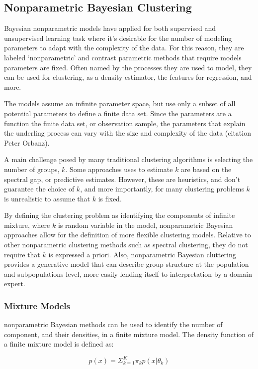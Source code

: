 \subsection{Nonparametric Bayesian Clustering}
Bayesian nonparametric models have applied for both supervised and unsupervised learning task where it's desirable for the number of modeling parameters to adapt with the complexity of the data.   For this reason, they are labeled `nonparametric' and contrast parametric methods that require models parameters are fixed.  Often named by the processes they are used to model, they can be used for clustering, as a density estimator, the features for regression, and more.

The models assume an infinite parameter space, but use only a subset of all potential parameters to define a finite data set.   Since the parameters are a function the finite data set, or observation sample, the parameters that explain the underling process can vary with the size and complexity of the data (citation Peter Orbanz).

A main challenge posed by many traditional clustering algorithms is selecting the number of groups, $k$.   Some approaches uses to estimate $k$ are based on the spectral gap, or predictive estimates.  However, these are heuristics, and don't guarantee the choice of $k$, and more importantly, for many clustering problems $k$ is unrealistic to assume that $k$ is fixed.

By defining the clustering problem as identifying the components of infinite mixture, where $k$ is random variable in the model,  nonparametric Bayesian approaches allow for the definition of more flexible clustering models.  Relative to other nonparametric clustering methods such as spectral clustering, they do not require that $k$ is expressed a priori.  Also, nonparametric Bayesian cluttering provides a generative model that can describe group structure at the population and subpopulations level, more easily lending itself to interpretation by a domain expert.

\subsubsection{Mixture Models}
nonparametric Bayesian methods can be used to identify the number of component, and their densities, in a finite mixture model.  The density function of a finite mixture model is defined as:

$$p(x) = \Sigma_{k=1}^K \pi_k p(x|\theta_k)$$

